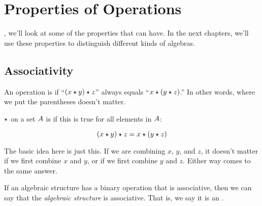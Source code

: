 \documentclass[../../../main.tex]{subfiles}
\begin{document}
\chapter{Properties of Operations}
\label{ch:properties-of-operations}

, we'll look at some of the properties that  can have. In the next chapters, we'll use these properties to distinguish different kinds of algebras.


\section{Associativity}

\begin{terminology}
  An operation is  if ``$\op{(\op{x}{y})}{z}$'' always equals ``$\op{x}{(\op{y}{z})}$.'' In other words, where we put the parentheses doesn't matter.
\end{terminology}

 $\opSymbol/$ on a set $A$ is  if this is true for all elements in $A$:

\begin{equation*}
  \op{(\op{x}{y})}{z} = \op{x}{(\op{y}{z})}
\end{equation*}

The basic idea here is just this. If we are combining $x$, $y$, and $z$, it doesn't matter if we first combine $x$ and $y$, or if we first combine $y$ and $z$. Either way comes to the same answer.

If an algebraic structure has a binary operation that is associative, then we can say that the \emph{algebraic structure} is associative. That is, we say it is an . 
\end{document}
